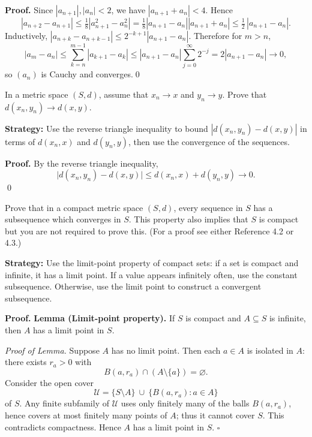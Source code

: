 \noindent\textbf{Proof.}
Since $|a_{n+1}|,|a_n|<2$, we have $|a_{n+1}+a_n|<4$. Hence
\[
|a_{n+2}-a_{n+1}|\le\tfrac18|a_{n+1}^2-a_n^2|=\tfrac18|a_{n+1}-a_n||a_{n+1}+a_n|
\le \tfrac12\,|a_{n+1}-a_n|.
\]
Inductively, $|a_{n+k}-a_{n+k-1}|\le 2^{-k+1}|a_{n+1}-a_n|$. Therefore for $m>n$,
\[
|a_m-a_n|\le \sum_{k=n}^{m-1}|a_{k+1}-a_k|\le |a_{n+1}-a_n|\sum_{j=0}^{\infty}2^{-j}=2|a_{n+1}-a_n|\to 0,
\]
so $(a_n)$ is Cauchy and converges.\qed
\medskip



\begin{problembox}
In a metric space $(S, d)$, assume that $x_n \to x$ and $y_n \to y$. Prove that $d(x_n, y_n) \to d(x, y)$.
\end{problembox}

\noindent\textbf{Strategy:} Use the reverse triangle inequality to bound $|d(x_n, y_n) - d(x, y)|$ in terms of $d(x_n, x)$ and $d(y_n, y)$, then use the convergence of the sequences.

\noindent\textbf{Proof.}
By the reverse triangle inequality,
\[
\big|d(x_n,y_n)-d(x,y)\big|\le d(x_n,x)+d(y_n,y)\to 0.
\]\qed
\medskip



\begin{problembox}
Prove that in a compact metric space $(S, d)$, every sequence in $S$ has a subsequence which converges in $S$. This property also implies that $S$ is compact but you are not required to prove this. (For a proof see either Reference 4.2 or 4.3.)
\end{problembox}

\noindent\textbf{Strategy:} Use the limit-point property of compact sets: if a set is compact and infinite, it has a limit point. If a value appears infinitely often, use the constant subsequence. Otherwise, use the limit point to construct a convergent subsequence.

\noindent\textbf{Proof.}
\textbf{Lemma (Limit-point property).}
If \(S\) is compact and \(A\subseteq S\) is infinite, then \(A\) has a limit point in \(S\).

\emph{Proof of Lemma.}
Suppose \(A\) has no limit point. Then each \(a\in A\) is isolated in \(A\): there exists \(r_a>0\) with
\[
B(a,r_a)\cap (A\setminus\{a\})=\varnothing.
\]
Consider the open cover
\[
\mathcal{U}=\{S\setminus A\}\ \cup\ \{B(a,r_a):a\in A\}
\]
of \(S\). Any finite subfamily of \(\mathcal{U}\) uses only finitely many of the balls \(B(a,r_a)\), hence covers at most finitely many points of \(A\); thus it cannot cover \(S\). This contradicts compactness. Hence \(A\) has a limit point in \(S\). \(\square\)

